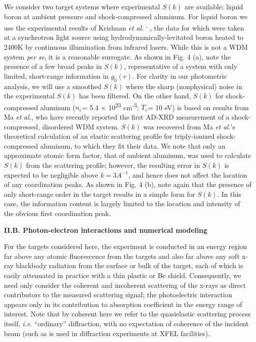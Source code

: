 We consider two target systems where experimental \(S(k)\) are
available: liquid boron at ambient pressure and shock-compressed
aluminum. For liquid boron we use the experimental results of Krishnan
\emph{et al.}
\hyperref[s.-krishnan-s.-ansell-j.-j.-felten-k.-j.-volin-and-d.-l.-price-physical-review-letters-81-586-1998.]\cite{KRISHNAN1998STRUCTURE}\textsuperscript{,}
\hyperref[s.-krishnan-and-d.-l.-price-journal-of-physics-condensed-matter-12-r145-2000.]\cite{KRISHNAN2000X},
the data for which were taken at a synchrotron light source using
hydrodynamically-levitated boron heated to 2400K by continuous
illumination from infrared lasers. While this is not a WDM system
\emph{per se}, it is a reasonable surrogate. As shown in Fig. 4 (a),
note the presence of a few broad peaks in \(S(k)\), representative of a
system with only limited, short-range information in
\(g_{\text{ii}}\left( r \right)\). For clarity in our photometric
analysis, we will use a smoothed \(S(k)\) where the sharp (nonphysical)
noise in the experimental \(S(k)\) has been filtered. On the other hand,
\(S(k)\) for shock-compressed aluminum (\(n_{e}\)= 5.4 ×
10\textsuperscript{23} cm\textsuperscript{-3}; \(T_{e}\)= 10 eV) is
based on results from Ma \emph{et
al.}\hyperref[t.-ma-et-al.-physical-review-letters-110-065001-2013.]\cite{MA2013X},
who have recently reported the first AD-XRD measurement of a
shock-compressed, disordered WDM system. \(S(k)\) was recovered from Ma
\emph{et al.}'s theoretical calculation of an elastic scattering profile
for triply-ionized shock-compressed aluminum, to which they fit their
data. We note that only an approximate atomic form factor, that of
ambient aluminum, was used to calculate \(S(k)\) from the scattering
profile; however, the resulting error in \(S(k)\) is expected to be
negligible above \(k = 3A^{- 1}\), and hence does not affect the
location of any coordination peaks. As shown in Fig. 4 (b), note again
that the presence of only short-range order in the target results in a
simple form for \(S(k)\). In this case, the information content is
largely limited to the location and intensity of the obvious first
coordination peak.

\textbf{II.B. Photon-electron interactions and numerical modeling }

For the targets considered here, the experiment is conducted in an
energy region far above any atomic fluorescence from the targets and
also far above any soft x-ray blackbody radiation from the surface or
bulk of the target, each of which is easily attenuated in practice with
a thin plastic or Be shield. Consequently, we need only consider the
coherent and incoherent scattering of the x-rays as direct contributors
to the measured scattering signal; the photoelectric interaction appears
only in its contribution to absorption coefficient in the energy range
of interest. Note that by coherent here we refer to the quasielastic
scattering process itself, \emph{i.e.} ``ordinary'' diffraction, with no
expectation of coherence of the incident beam (such as is used in
diffraction experiments at XFEL facilities).

